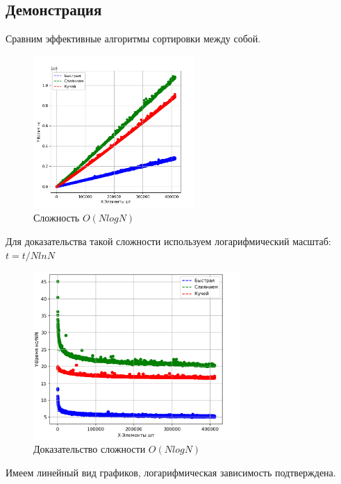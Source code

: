 \documentclass[a4paper,12pt]{article} %
\begin{document}
\subsection{Демонстрация}
Сравним эффективные алгоритмы сортировки между собой.
\begin{figure}[H]
    \centering
    \includegraphics[width=0.55\textwidth]{img/first/qw.jpg}
    \caption{Сложность $O(NlogN)$}
\end{figure} 
Для доказательства такой сложности используем логарифмический масштаб:
$t=t/NlnN$
\begin{figure}[H]
    \centering
    \includegraphics[width=0.7\textwidth]{img/first/qvln.jpg}
    \caption{Доказательство сложности $O(NlogN)$}
\end{figure} 
Имеем линейный вид графиков, логарифмическая зависимость подтверждена.
\end{document}
